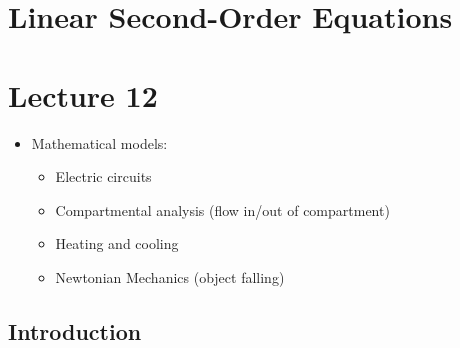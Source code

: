 \chapter{Linear Second-Order Equations}
\chapter*{Lecture 12}
\begin{recall}{}{}
\begin{itemize}
\item Mathematical models:
\begin{itemize}
\item Electric circuits
\item Compartmental analysis (flow in/out of compartment)
\item Heating and cooling
\item Newtonian Mechanics (object falling)
\end{itemize}
\end{itemize}
\end{recall}



\section{Introduction}
